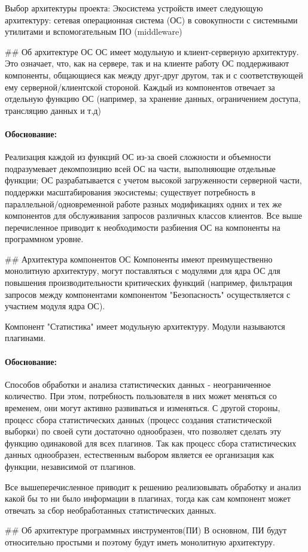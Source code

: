 Выбор архитектуры проекта:
Экосистема устройств имеет следующую архитектуру: сетевая операционная система (ОС) в совокупности с системными утилитами и вспомогательным ПО (middleware)

## Об архитектуре ОС
ОС имеет модульную и клиент-серверную архитектуру. Это означает, что, как на сервере, так и на клиенте работу ОС поддерживают компоненты, общающиеся как между друг-друг другом, так и с соответствующей ему серверной/клиентской стороной.
Каждый из компонентов отвечает за отдельную функцию ОС (например, за хранение данных, ограничением доступа, трансляцию данных и т.д)

\paragraph{Обоснование:} 
Реализация каждой из функций ОС из-за своей сложности и объемности подразумевает декомпозицию всей ОС на части, выполняющие отдельные функции; ОС разрабатывается с учетом высокой загруженности серверной части, поддержки масштабирования экосистемы; существует потребность в параллельной/одновременной работе разных модификациях одних и тех же компонентов для обслуживания запросов различных классов клиентов.
Все выше перечисленное приводит к необходимости разбиения ОС на компоненты на программном уровне.

## Архитектура компонентов ОС
Компоненты имеют преимущественно монолитную архитектуру, могут поставляться с модулями для ядра ОС для повышения производительности критических функций (например, фильтрация запросов между компонентами компонентом "Безопасность" осуществляется с участием модуля ядра ОС). 

Компонент "Статистика" имеет модульную архитектуру. Модули называются плагинами. 

\paragraph{Обоснование:} 
Способов обработки и анализа статистических данных - неограниченное количество. При этом, потребность пользователя в них может меняться со временем, они могут активно развиваться и изменяться.
С другой стороны, процесс сбора статистических данных (процесс создания статистической выборки) по своей сути достаточно однообразен, что позволяет сделать эту функцию одинаковой для всех плагинов. Так как процесс сбора статистических данных однообразен, естественным выбором является ее организация как функции, независимой от плагинов.

Все вышеперечисленное приводит к решению реализовывать обработку и анализ какой бы то ни было информации в плагинах, тогда как сам компонент может отвечать за сбор необработанных статистических данных.  

## Об архитектуре программных инструментов(ПИ)
В основном, ПИ будут относительно простыми и поэтому будут иметь монолитную архитектуру.
